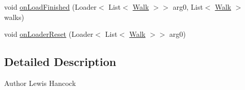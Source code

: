 \begin{DoxyCompactItemize}
\item 
void \hyperlink{classuk_1_1ac_1_1swan_1_1digitaltrails_1_1fragments_1_1_search_list_fragment_a547f9c40a40ae499759f22d979bdfc54}{on\+Load\+Finished} (Loader$<$ List$<$ \hyperlink{classuk_1_1ac_1_1swan_1_1digitaltrails_1_1components_1_1_walk}{Walk} $>$$>$ arg0, List$<$ \hyperlink{classuk_1_1ac_1_1swan_1_1digitaltrails_1_1components_1_1_walk}{Walk} $>$ walks)
\item 
void \hyperlink{classuk_1_1ac_1_1swan_1_1digitaltrails_1_1fragments_1_1_search_list_fragment_a658b4fc2640180401f37203d425e6550}{on\+Loader\+Reset} (Loader$<$ List$<$ \hyperlink{classuk_1_1ac_1_1swan_1_1digitaltrails_1_1components_1_1_walk}{Walk} $>$$>$ arg0)
\end{DoxyCompactItemize}


\subsection{Detailed Description}
\begin{DoxyAuthor}{Author}
Lewis Hancock 
\end{DoxyAuthor}


